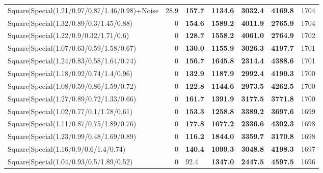 \begin{tabular}{lrllllr}
 Square|Special(1.21/0.97/0.87/1.46/0.98)+Noise                &            28.9 & \textbf{157.7} & \textbf{1134.6} & \textbf{3032.4} & \textbf{4169.8} &         1704 \\
 Square|Special(1.32/0.89/0.3/1.45/0.88)                       &             0   & \textbf{154.6} & \textbf{1589.2} & \textbf{4011.9} & \textbf{2765.9} &         1704 \\
 Square|Special(1.22/0.9/0.32/1.71/0.6)                        &             0   & \textbf{128.7} & \textbf{1558.2} & \textbf{4061.0} & \textbf{2764.9} &         1702 \\
 Square|Special(1.07/0.63/0.59/1.58/0.67)                      &             0   & \textbf{130.0} & \textbf{1155.9} & \textbf{3026.3} & \textbf{4197.7} &         1701 \\
 Square|Special(1.24/0.83/0.58/1.64/0.74)                      &             0   & \textbf{156.7} & \textbf{1645.8} & \textbf{2314.4} & \textbf{4388.6} &         1701 \\
 Square|Special(1.18/0.92/0.74/1.4/0.96)                       &             0   & \textbf{132.9} & \textbf{1187.9} & \textbf{2992.4} & \textbf{4190.3} &         1700 \\
 Square|Special(1.08/0.59/0.86/1.59/0.72)                      &             0   & \textbf{122.8} & \textbf{1144.6} & \textbf{2973.5} & \textbf{4262.5} &         1700 \\
 Square|Special(1.27/0.89/0.72/1.33/0.66)                      &             0   & \textbf{161.7} & \textbf{1391.9} & \textbf{3177.5} & \textbf{3771.8} &         1700 \\
 Square|Special(1.02/0.77/0.1/1.78/0.61)                       &             0   & \textbf{153.3} & \textbf{1258.8} & \textbf{3389.2} & \textbf{3697.6} &         1699 \\
 Square|Special(1.11/0.87/0.75/1.89/0.76)                      &             0   & \textbf{177.8} & \textbf{1677.2} & \textbf{2336.6} & \textbf{4302.3} &         1698 \\
 Square|Special(1.23/0.99/0.48/1.69/0.89)                      &             0   & \textbf{116.2} & \textbf{1844.0} & \textbf{3359.7} & \textbf{3170.8} &         1698 \\
 Square|Special(1.16/0.9/0.6/1.4/0.74)                         &             0   & \textbf{140.4} & \textbf{1099.3} & \textbf{3048.8} & \textbf{4198.3} &         1697 \\
 Square|Special(1.04/0.93/0.5/1.89/0.52)                       &             0   & 92.4           & \textbf{1347.0} & \textbf{2447.5} & \textbf{4597.5} &         1696 \\

\end{tabular}
